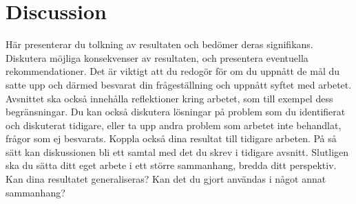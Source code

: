 \section{Discussion}


{\color{blue}
H\"ar presenterar du tolkning av resultaten och bed\"omer deras signifikans. Diskutera m\"ojliga konsekvenser av resultaten, och presentera eventuella rekommendationer. Det \"ar viktigt att du redog\"or f\"or om du uppn\r{a}tt de m\r{a}l du satte upp och d\"armed besvarat din fr\r{a}gest\"allning och uppn\r{a}tt syftet med arbetet. Avsnittet ska ocks\r{a} inneh\r{a}lla reflektioner kring arbetet, som till exempel dess begr\"ansningar.  Du kan ocks\r{a} diskutera l\"osningar p\r{a} problem som du identifierat och diskuterat tidigare, eller ta upp andra problem som arbetet inte behandlat, fr\r{a}gor som ej besvarats. Koppla ocks\r{a} dina resultat till tidigare arbeten. P\r{a} s\r{a} s\"att kan diskussionen bli ett samtal med det du skrev i tidigare avsnitt.  Slutligen ska du s\"atta ditt eget arbete i ett st\"orre sammanhang, bredda ditt perspektiv. Kan dina resultatet generaliseras? Kan det du gjort anv\"andas i n\r{a}got annat sammanhang?}
